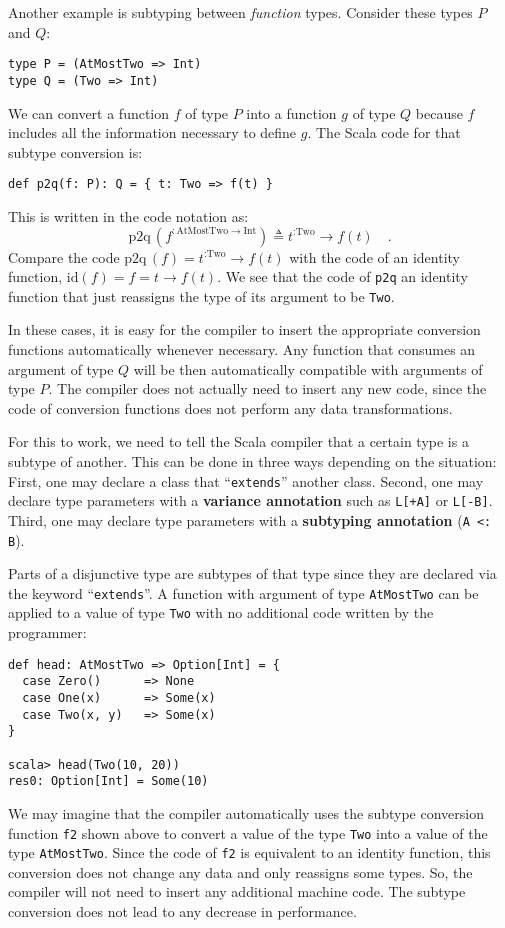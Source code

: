 Another example is  subtyping between \emph{function} types. Consider
these types $P$ and $Q$:
\begin{lstlisting}
type P = (AtMostTwo => Int)
type Q = (Two => Int)
\end{lstlisting}
We can convert a function $f$ of type $P$ into a function $g$ of
type $Q$ because $f$ includes all the information necessary to define
$g$. The Scala code for that subtype conversion is:
\begin{lstlisting}
def p2q(f: P): Q = { t: Two => f(t) }
\end{lstlisting}
This is written in the code notation as:
\[
\text{p2q}\,(f^{:\text{AtMostTwo}\rightarrow\text{Int}})\triangleq t^{:\text{Two}}\rightarrow f(t)\quad.
\]
Compare the code $\text{p2q}\,(f)=t^{:\text{Two}}\rightarrow f(t)$
with the code of an identity function, $\text{id}\left(f\right)=f=t\rightarrow f(t)$.
We see that the code of \lstinline!p2q! an identity function that
just reassigns the type of its argument to be \lstinline!Two!.

In these cases, it is easy for the compiler to insert the appropriate
conversion functions automatically whenever necessary. Any function
that consumes an argument of type $Q$ will be then automatically
compatible with arguments of type $P$. The compiler does not actually
need to insert any new code, since the code of conversion functions
does not perform any data transformations.

For this to work, we need to tell the Scala compiler that a certain
type is a subtype of another. This can be done in three ways depending
on the situation: First, one may declare a class that \textsf{``}\lstinline!extends!\textsf{''}
another class. Second, one may declare type parameters with a \textbf{variance
annotation} such as \lstinline!L[+A]! or \lstinline!L[-B]!. Third,
one may declare type parameters with a \textbf{subtyping annotation}
(\lstinline!A <: B!).

Parts of a disjunctive type are subtypes of that type since they are
declared via the keyword \textsf{``}\lstinline!extends!\textsf{''}. A
function with argument of type \lstinline!AtMostTwo! can be applied
to a value of type \lstinline!Two! with no additional code written
by the programmer:
\begin{lstlisting}
def head: AtMostTwo => Option[Int] = {
  case Zero()      => None
  case One(x)      => Some(x)
  case Two(x, y)   => Some(x)
}

scala> head(Two(10, 20))
res0: Option[Int] = Some(10)
\end{lstlisting}
We may imagine that the compiler automatically uses the subtype conversion
function \lstinline!f2! shown above to convert a value of the type
\lstinline!Two! into a value of the type \lstinline!AtMostTwo!.
Since the code of \lstinline!f2! is equivalent to an identity function,
this conversion does not change any data and only reassigns some types.
So, the compiler will not need to insert any additional machine code.
The subtype conversion does not lead to any decrease in performance.

